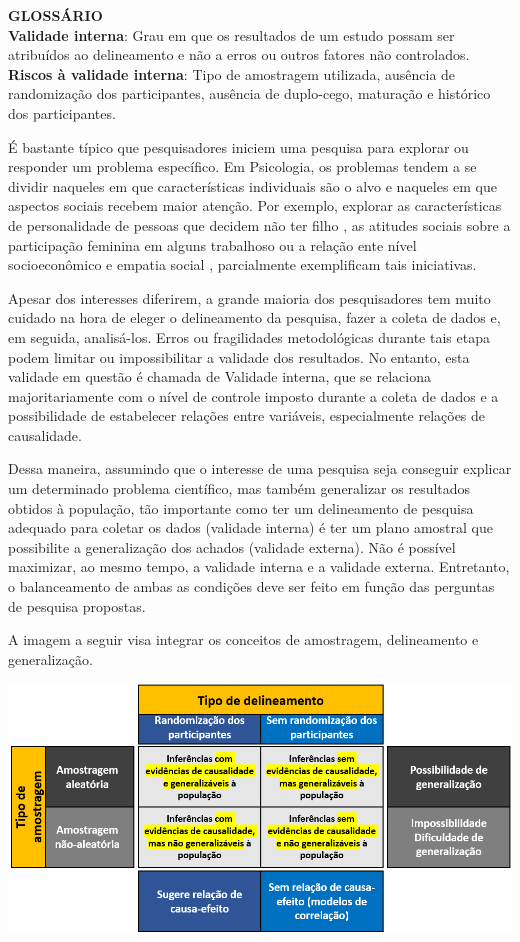 \documentclass[
]{book}
\begin{document}
\textbf{GLOSSÁRIO}\\
\textbf{Validade interna}: Grau em que os resultados de um estudo possam ser atribuídos ao delineamento e não a erros ou outros fatores não controlados.\\
\textbf{Riscos à validade interna}: Tipo de amostragem utilizada, ausência de randomização dos participantes, ausência de duplo-cego, maturação e histórico dos participantes.

É bastante típico que pesquisadores iniciem uma pesquisa para explorar ou responder um problema específico. Em Psicologia, os problemas tendem a se dividir naqueles em que características individuais são o alvo e naqueles em que aspectos sociais recebem maior atenção. Por exemplo, explorar as características de personalidade de pessoas que decidem não ter filho \citep{Neal2021}, as atitudes sociais sobre a participação feminina em alguns trabalhoso \citep{Bursztyn2018} ou a relação ente nível socioeconômico e empatia social \citep{Piff2012}, parcialmente exemplificam tais iniciativas.

Apesar dos interesses diferirem, a grande maioria dos pesquisadores tem muito cuidado na hora de eleger o delineamento da pesquisa, fazer a coleta de dados e, em seguida, analisá-los. Erros ou fragilidades metodológicas durante tais etapa podem limitar ou impossibilitar a validade dos resultados. No entanto, esta validade em questão é chamada de Validade interna, que se relaciona majoritariamente com o nível de controle imposto durante a coleta de dados e a possibilidade de estabelecer relações entre variáveis, especialmente relações de causalidade.

Dessa maneira, assumindo que o interesse de uma pesquisa seja conseguir explicar um determinado problema científico, mas também generalizar os resultados obtidos à população, tão importante como ter um delineamento de pesquisa adequado para coletar os dados (validade interna) é ter um plano amostral que possibilite a generalização dos achados (validade externa). Não é possível maximizar, ao mesmo tempo, a validade interna e a validade externa. Entretanto, o balanceamento de ambas as condições deve ser feito em função das perguntas de pesquisa propostas.

A imagem a seguir visa integrar os conceitos de amostragem, delineamento e generalização.

\includegraphics{./img/cap_amostra_delineamento.png}
\end{document}
